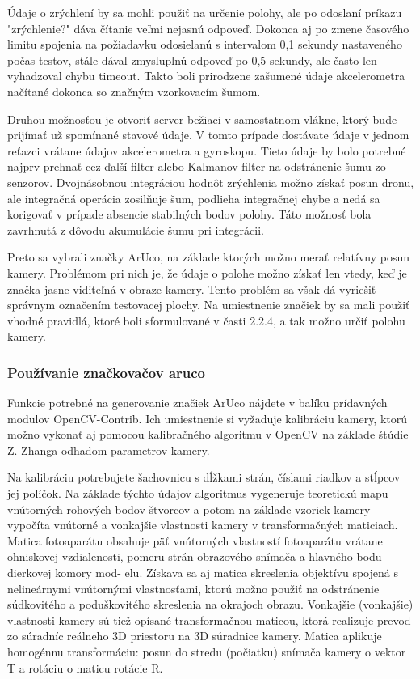 {Údaje o zrýchlení by sa mohli použiť na určenie polohy, ale po odoslaní príkazu "zrýchlenie?" dáva čítanie veľmi nejasnú odpoveď. Dokonca aj po zmene časového limitu spojenia na požiadavku odosielanú s intervalom 0,1 sekundy nastaveného počas testov, stále dával zmysluplnú odpoveď po 0,5 sekundy, ale často len vyhadzoval chybu timeout. Takto boli prirodzene zašumené údaje akcelerometra načítané dokonca so značným vzorkovacím šumom. 

Druhou možnosťou je otvoriť server bežiaci v samostatnom vlákne, ktorý bude prijímať už spomínané stavové údaje. V tomto prípade dostávate údaje v jednom reťazci vrátane údajov akcelerometra a gyroskopu. Tieto údaje by bolo potrebné najprv prehnať cez ďalší filter \citep{7859621} alebo Kalmanov filter \citep{8839496} na odstránenie šumu zo senzorov. Dvojnásobnou integráciou hodnôt zrýchlenia možno získať posun dronu, ale integračná operácia zosilňuje šum, podlieha integračnej chybe a nedá sa korigovať v prípade absencie stabilných bodov polohy. Táto možnosť bola zavrhnutá z dôvodu akumulácie šumu pri integrácii. 

Preto sa vybrali značky ArUco, na základe ktorých možno merať relatívny posun kamery. Problémom pri nich je, že údaje o polohe možno získať len vtedy, keď je značka jasne viditeľná v obraze kamery. Tento problém sa však dá vyriešiť správnym označením testovacej plochy. Na umiestnenie značiek by sa mali použiť vhodné pravidlá, ktoré boli sformulované v časti 2.2.4, a tak možno určiť polohu kamery. 

\subsubsection{Používanie značkovačov aruco}
Funkcie potrebné na generovanie značiek ArUco nájdete v balíku prídavných modulov OpenCV-Contrib. Ich umiestnenie si vyžaduje kalibráciu kamery, ktorú možno vykonať aj pomocou kalibračného algoritmu v OpenCV na základe štúdie Z. Zhanga \citep{888718} odhadom parametrov kamery. 

Na kalibráciu potrebujete šachovnicu s dĺžkami strán, číslami riadkov a stĺpcov jej políčok. Na základe týchto údajov algoritmus vygeneruje teoretickú mapu vnútorných rohových bodov štvorcov a potom na základe vzoriek kamery vypočíta vnútorné a vonkajšie vlastnosti kamery v transformačných maticiach. Matica fotoaparátu obsahuje päť vnútorných vlastností fotoaparátu vrátane ohniskovej vzdialenosti, pomeru strán obrazového snímača a hlavného bodu dierkovej komory mod- elu. Získava sa aj matica skreslenia objektívu spojená s nelineárnymi vnútornými vlastnosťami, ktorú možno použiť na odstránenie súdkovitého a poduškovitého skreslenia na okrajoch obrazu. Vonkajšie (vonkajšie) vlastnosti kamery sú tiež opísané transformačnou maticou, ktorá realizuje prevod zo súradníc reálneho 3D priestoru na 3D súradnice kamery. Matica aplikuje homogénnu transformáciu: posun do stredu (počiatku) snímača kamery o vektor T a rotáciu o maticu rotácie R. 

}
